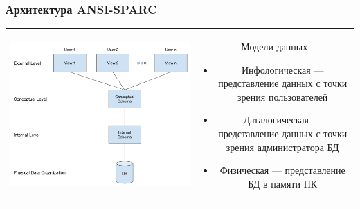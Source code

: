 \documentclass[aspectratio=169]{beamer}
\begin{document}
\begin{frame}[fragile]
  \transwipe[direction=90]
  \frametitle{Архитектура ANSI-SPARC}
  
  \begin{tabular}{c c}
    \begin{minipage}{.6\textwidth}
      \includegraphics[width=\linewidth]{pictures/ANSI_SPARC.pdf} 
    \end{minipage}
    &
    \begin{minipage}{.35\textwidth}
    Модели данных
      \begin{itemize}
        \item Инфологическая --- представление данных с точки зрения пользователей
        \item Даталогическая --- представление данных с точки зрения администратора БД
        \item Физическая --- представление БД в памяти ПК
      \end{itemize}
    \end{minipage}
  \end{tabular}
\end{frame}
\end{document}
